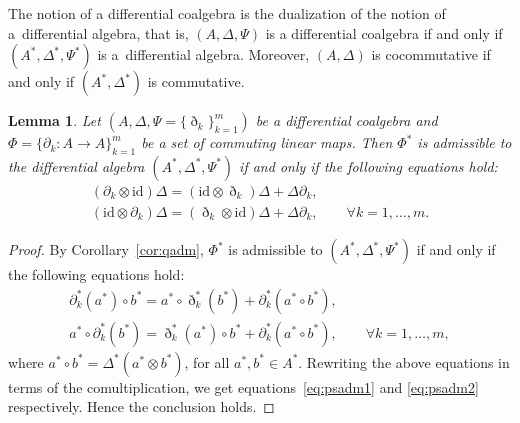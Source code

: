 \documentclass[pdftex]{sigma}
\numberwithin{equation}{section}
\newtheorem{Lemma}[Theorem]{Lemma}
\newcommand{\id}{\mathrm{id}}
\begin{document}
\begin{Remark}
 The notion of a differential coalgebra is the dualization of the notion of a~differential algebra, that is, $(A, \Delta, \Psi)$ is a differential coalgebra if and only if $(A^*, \Delta^*, \Psi^*)$ is a~differential algebra.
 Moreover, $(A,\Delta)$ is cocommutative if and only if
 $(A^*,\Delta^*)$ is commutative.
\end{Remark}

\begin{Lemma}\label{lem:coadm}
 Let $(A, \Delta, \Psi = \{\eth_k\}_{k=1}^m)$ be a differential coalgebra and
 $\Phi = \{\partial_k\colon A \to A\}_{k=1}^m$ be a set of commuting linear maps.
 Then $\Phi^*$ is admissible to the differential algebra $(A^*, \Delta^*, \Psi^*)$ if and only
 if the following equations hold:
 \begin{gather}
 (\partial_k \otimes \id) \Delta = (\id \otimes \eth_k) \Delta + \Delta \partial_k, \label{eq:psadm1} \\
 (\id \otimes \partial_k) \Delta = (\eth_k \otimes \id) \Delta + \Delta \partial_k, \qquad \forall k=1, \dots, m. \label{eq:psadm2}
 \end{gather}
\end{Lemma}
\begin{proof}
By Corollary~\ref{cor:qadm}, $\Phi^*$ is admissible to $(A^*, \Delta^*, \Psi^*)$ if and only if the following equations hold:
\begin{gather*}
	\partial_k^*(a^*) \circ b^* = a^* \circ \eth_k^*(b^*) + \partial_k^*(a^* \circ b^*), \\
 a^* \circ \partial_k^*(b^*) = \eth_k^*(a^*) \circ b^* + \partial_k^*(a^* \circ b^*), \qquad \forall k=1, \dots, m,
\end{gather*}
where $a^* \circ b^* = \Delta^*(a^*\otimes b^*)$, for all $a^*, b^* \in A^*$.
Rewriting the above equations in terms of the comultiplication, we
get equations~\eqref{eq:psadm1} and \eqref{eq:psadm2} respectively.
Hence the conclusion holds.
\end{proof}
\end{document}
